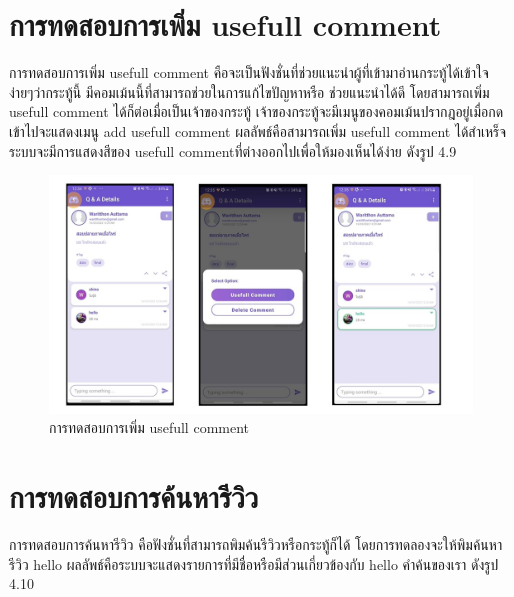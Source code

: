 \section{การทดสอบการเพิ่ม usefull comment}
\quad \quad การทดสอบการเพิ่ม usefull comment คือจะเป็นฟังชั่นที่ช่วยแนะนำผู้ที่เข้ามาอ่านกระทู้ได้เข้าใจง่ายๆว่ากระทู้นี้ มีคอมเม้นนี้ที่สามารถช่วยในการแก้ไขปัญหาหรือ
ช่วยแนะนำได้ดี โดยสามารถเพิ่ม usefull comment ได้ก็ต่อเมื่อเป็นเจ้าของกระทู้ เจ้าของกระทู้จะมีเมนูของคอมเม้นปรากฎอยู่เมื่อกดเข้าไปจะแสดงเมนู add usefull comment 
ผลลัพธ์คือสามารถเพิ่ม usefull comment ได้สำเหร็จ ระบบจะมีการแสดงสีของ usefull commentที่ต่างออกไปเพื่อให้มองเห็นได้ง่าย  ดังรูป 4.9

\begin{figure}
    \begin{center}
      \includegraphics[width=1\textwidth]{./image/testing/Slide10.JPG}
    \end{center}
    \caption[การทดสอบการเพิ่ม usefull comment]{การทดสอบการเพิ่ม usefull comment}
    \end{figure}

\section{การทดสอบการค้นหารีวิว}
\quad \quad การทดสอบการค้นหารีวิว คือฟังชั่นที่สามารถพิมค้นรีวิวหรือกระทู้ก็ได้ โดยการทดลองจะให้พิมค้นหารีวิว hello  
ผลลัพธ์คือระบบจะแสดงรายการที่มีชื่อหรือมีส่วนเกี่ยวข้องกับ hello คำค้นของเรา  ดังรูป 4.10

